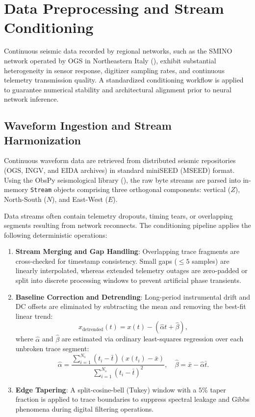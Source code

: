 \section{Data Preprocessing and Stream Conditioning}
\label{sec:preprocessing}

Continuous seismic data recorded by regional networks, such as the \ac{SMINO} network operated by \ac{OGS} in Northeastern Italy (\cite{SMINO}), exhibit substantial heterogeneity in sensor response, digitizer sampling rates, and continuous telemetry transmission quality. A standardized conditioning workflow is applied to guarantee numerical stability and architectural alignment prior to neural network inference.

\subsection{Waveform Ingestion and Stream Harmonization}
Continuous waveform data are retrieved from distributed seismic repositories (OGS, INGV, and EIDA archives) in standard miniSEED (MSEED) format. Using the ObsPy seismological library (\cite{ObsPy}), the raw byte streams are parsed into in-memory \texttt{Stream} objects comprising three orthogonal components: vertical ($Z$), North-South ($N$), and East-West ($E$).

Data streams often contain telemetry dropouts, timing tears, or overlapping segments resulting from network reconnects. The conditioning pipeline applies the following deterministic operations:
\begin{enumerate}
  \item \textbf{Stream Merging and Gap Handling}: Overlapping trace fragments are cross-checked for timestamp consistency. Small gaps ($\le 5$ samples) are linearly interpolated, whereas extended telemetry outages are zero-padded or split into discrete processing windows to prevent artificial phase transients.
  \item \textbf{Baseline Correction and Detrending}: Long-period instrumental drift and DC offsets are eliminated by subtracting the mean and removing the best-fit linear trend:
  \begin{equation}
    x_{\mathrm{detrended}}(t) = x(t) - (\hat{\alpha} t + \hat{\beta}),
  \end{equation}
  where $\hat{\alpha}$ and $\hat{\beta}$ are estimated via ordinary least-squares regression over each unbroken trace segment:
  \begin{equation}
    \hat{\alpha} = \frac{\sum_{i=1}^{N_s} (t_i - \bar{t})(x(t_i) - \bar{x})}{\sum_{i=1}^{N_s} (t_i - \bar{t})^2}, \quad \hat{\beta} = \bar{x} - \hat{\alpha}\bar{t}.
  \end{equation}
  \item \textbf{Edge Tapering}: A split-cosine-bell (Tukey) window with a $5\%$ taper fraction is applied to trace boundaries to suppress spectral leakage and Gibbs phenomena during digital filtering operations.
\end{enumerate}

